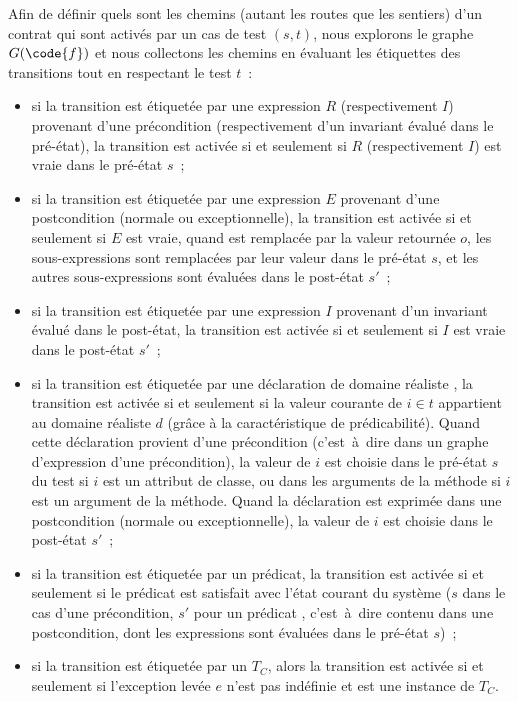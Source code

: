 Afin de définir quels sont les chemins (autant les routes que les sentiers) d'un
contrat qui sont activés par un cas de test $(s, t)$, nous explorons le graphe
$G(\code{f})$ et nous collectons les chemins en évaluant les étiquettes des
transitions tout en respectant le test $t$~:
%
\begin{itemize}

\item si la transition est étiquetée par une expression $R$ (respectivement
$I$) provenant d'une précondition (respectivement d'un invariant évalué dans le
pré-état), la transition est activée si et seulement si $R$ (respectivement $I$)
est vraie dans le pré-état $s$~;

\item si la transition est étiquetée par une expression $E$ provenant d'une
postcondition (normale ou exceptionnelle), la transition est activée si et
seulement si $E$ est vraie, quand \aresult est remplacée par la valeur retournée
$o$, les sous-expressions \aold{\empty} sont remplacées par leur valeur dans le
pré-état $s$, et les autres sous-expressions sont évaluées dans le post-état
$s'$~;

\item si la transition est étiquetée par une expression $I$ provenant d'un
invariant évalué dans le post-état, la transition est activée si et seulement si
$I$ est vraie dans le post-état $s'$~;

\item si la transition est étiquetée par une déclaration de domaine réaliste
, la transition est activée si et seulement si la valeur courante
de $i \in t$ appartient au domaine réaliste $d$ (grâce à la caractéristique de
prédicabilité). Quand cette déclaration provient d'une précondition
(c'est~à~dire dans un graphe d'expression d'une précondition), la valeur de $i$
est choisie dans le pré-état $s$ du test si $i$ est un attribut de classe, ou
dans les arguments de la méthode si $i$ est un argument de la méthode. Quand la
déclaration est exprimée dans une postcondition (normale ou exceptionnelle), la
valeur de $i$ est choisie dans le post-état $s'$~;

\item si la transition est étiquetée par un prédicat, la transition est activée
si et seulement si le prédicat est satisfait avec l'état courant du système ($s$
dans le cas d'une précondition, $s'$ pour un prédicat ,
c'est~à~dire contenu dans une postcondition, dont les expressions \aold{\empty}
sont évaluées dans le pré-état $s$)~;

\item si la transition est étiquetée par un  $T_C$,
alors la transition est activée si et seulement si l'exception levée $e$ n'est
pas indéfinie et est une instance de $T_C$.

\end{itemize}

